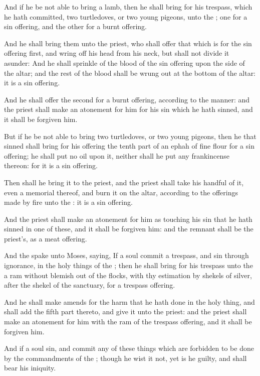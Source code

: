 \verse And if he be not able to bring a lamb, then he shall bring for his trespass, which he hath committed, two turtledoves, or two young pigeons, unto the \LORD; one for a sin offering, and the other for a burnt offering.

\verse And he shall bring them unto the priest, who shall offer that which is for the sin offering first, and wring off his head from his neck, but shall not divide it asunder: \verse And he shall sprinkle of the blood of the sin offering upon the side of the altar; and the rest of the blood shall be wrung out at the bottom of the altar: it is a sin offering.

\verse And he shall offer the second for a burnt offering, according to the manner: and the priest shall make an atonement for him for his sin which he hath sinned, and it shall be forgiven him.

\verse But if he be not able to bring two turtledoves, or two young pigeons, then he that sinned shall bring for his offering the tenth part of an ephah of fine flour for a sin offering; he shall put no oil upon it, neither shall he put any frankincense thereon: for it is a sin offering.

\verse Then shall he bring it to the priest, and the priest shall take his handful of it, even a memorial thereof, and burn it on the altar, according to the offerings made by fire unto the \LORD: it is a sin offering.

\verse And the priest shall make an atonement for him as touching his sin that he hath sinned in one of these, and it shall be forgiven him: and the remnant shall be the priest's, as a meat offering.

\verse And the \LORD spake unto Moses, saying, \verse If a soul commit a trespass, and sin through ignorance, in the holy things of the \LORD; then he shall bring for his trespass unto the \LORD a ram without blemish out of the flocks, with thy estimation by shekels of silver, after the shekel of the sanctuary, for a trespass offering.

\verse And he shall make amends for the harm that he hath done in the holy thing, and shall add the fifth part thereto, and give it unto the priest: and the priest shall make an atonement for him with the ram of the trespass offering, and it shall be forgiven him.

\verse And if a soul sin, and commit any of these things which are forbidden to be done by the commandments of the \LORD; though he wist it not, yet is he guilty, and shall bear his iniquity.

